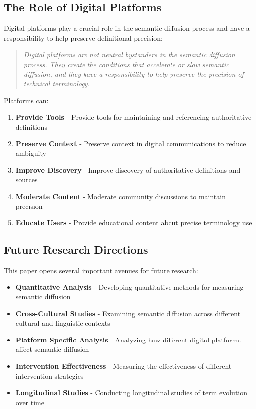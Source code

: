 \documentclass[11pt]{article}
\begin{document}
\subsection{The Role of Digital Platforms}

Digital platforms play a crucial role in the semantic diffusion process and have a responsibility to help preserve definitional precision:

\begin{quote}
\emph{Digital platforms are not neutral bystanders in the semantic diffusion process. They create the conditions that accelerate or slow semantic diffusion, and they have a responsibility to help preserve the precision of technical terminology.}
\end{quote}

Platforms can:

\begin{enumerate}
\item \textbf{Provide Tools} - Provide tools for maintaining and referencing authoritative definitions
\item \textbf{Preserve Context} - Preserve context in digital communications to reduce ambiguity
\item \textbf{Improve Discovery} - Improve discovery of authoritative definitions and sources
\item \textbf{Moderate Content} - Moderate community discussions to maintain precision
\item \textbf{Educate Users} - Provide educational content about precise terminology use
\end{enumerate}

\subsection{Future Research Directions}

This paper opens several important avenues for future research:

\begin{itemize}
\item \textbf{Quantitative Analysis} - Developing quantitative methods for measuring semantic diffusion
\item \textbf{Cross-Cultural Studies} - Examining semantic diffusion across different cultural and linguistic contexts
\item \textbf{Platform-Specific Analysis} - Analyzing how different digital platforms affect semantic diffusion
\item \textbf{Intervention Effectiveness} - Measuring the effectiveness of different intervention strategies
\item \textbf{Longitudinal Studies} - Conducting longitudinal studies of term evolution over time
\end{itemize}
\end{document}
